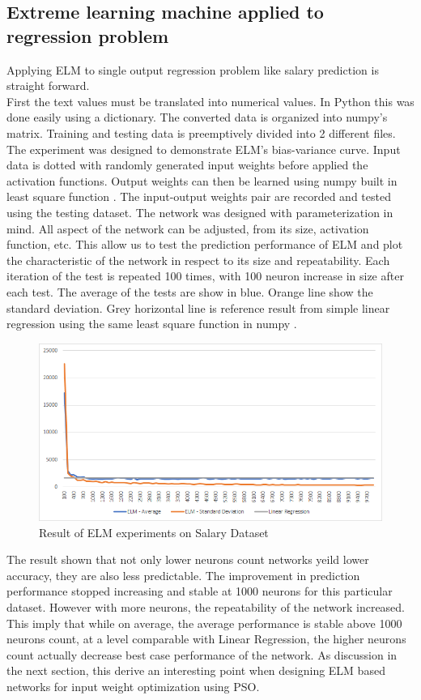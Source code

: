 \documentclass[13pt]{article}
\begin{document}
\subsection{Extreme learning machine applied to regression problem}
Applying ELM to single output regression problem like salary prediction is straight forward. \\
First the text values must be translated into numerical values. In Python this was done easily using a dictionary. The converted data is organized into numpy's matrix. Training and testing data is preemptively divided into 2 different files.\\
The experiment was designed to demonstrate ELM's bias-variance curve. Input data is dotted with randomly generated input weights before applied the activation functions. Output weights can then be learned using numpy built in least square function \cite{van_der_walt_numpy_2011}. The input-output weights pair are recorded and tested using the testing dataset.
The network was designed with parameterization in mind. All aspect of the network can be adjusted, from its size, activation function, etc. This allow us to test the prediction performance of ELM and plot the characteristic of the network in respect to its size and repeatability. Each iteration of the test is repeated 100 times, with 100 neuron increase in size after each test. The average of the tests are show in blue. Orange line show the standard deviation. Grey horizontal line is reference result from simple linear regression using the same least square function in numpy \cite{van_der_walt_numpy_2011}.\\
\begin{figure}[H]
    \begin{center}
        \includegraphics [width=\textwidth] {result}
    \end{center}
    \caption{Result of ELM experiments on Salary Dataset} 
    \label{fig:plot_result}       
\end{figure}
The result shown that not only lower neurons count networks yeild lower accuracy, they are also less predictable. The improvement in prediction performance stopped increasing and stable at 1000 neurons for this particular dataset. However with more neurons, the repeatability of the network increased. This imply that while on average, the average performance is stable above 1000 neurons count, at a level comparable with Linear Regression, the higher neurons count actually decrease best case performance of the network. As discussion in the next section, this derive an interesting point when designing ELM based networks for input weight optimization using PSO.
\end{document}
